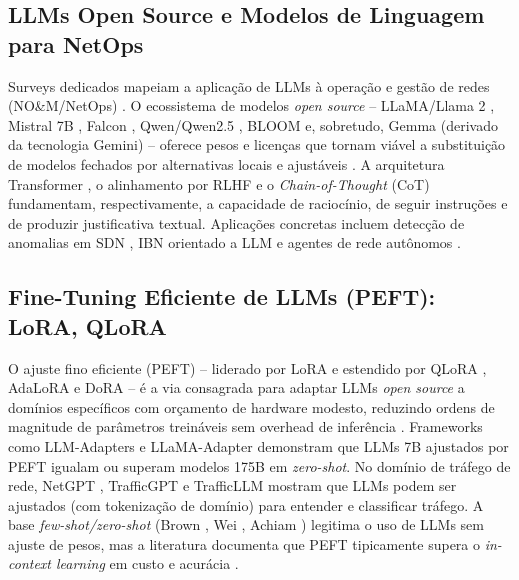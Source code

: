 \documentclass[12pt,a4paper]{article}
\begin{document}
\subsection{LLMs Open Source e Modelos de Linguagem para NetOps}
\label{sec:llm}

Surveys dedicados mapeiam a aplicação de LLMs à operação e gestão de redes
(NO\&M/NetOps) \cite{rA31}\cite{rA32}\cite{rA33}\cite{rA34}\cite{rA35}\cite{rA36}\cite{rA37}. O ecossistema de modelos
\textit{open source} -- LLaMA/Llama 2 \cite{rA310}\cite{rA311}, Mistral 7B \cite{rA312}, Falcon
\cite{rA313}, Qwen/Qwen2.5 \cite{rA314}\cite{rA315}, BLOOM \cite{rA316} e, sobretudo, Gemma
\cite{rA317} (derivado da tecnologia Gemini) -- oferece pesos e licenças que tornam
viável a substituição de modelos fechados por alternativas locais e ajustáveis
\cite{rA318}. A arquitetura Transformer \cite{rA319}, o alinhamento por RLHF \cite{rA320} e o
\textit{Chain-of-Thought} (CoT) \cite{rA321} fundamentam, respectivamente, a
capacidade de raciocínio, de seguir instruções e de produzir justificativa
textual. Aplicações concretas incluem detecção de anomalias em SDN
\cite{rA325}\cite{rA327}, IBN orientado a LLM \cite{rA324}\cite{rA332}\cite{rA333} e agentes de rede
autônomos \cite{rA338}\cite{rA334}\cite{rA335}\cite{rA336}\cite{rA337}.

\subsection{Fine-Tuning Eficiente de LLMs (PEFT): LoRA, QLoRA}
\label{sec:peft}

O ajuste fino eficiente (PEFT) -- liderado por LoRA \cite{rA41} e estendido por QLoRA
\cite{rA42}, AdaLoRA \cite{rA43} e DoRA \cite{rA44} -- é a via consagrada para adaptar LLMs
\textit{open source} a domínios específicos com orçamento de hardware modesto,
reduzindo ordens de magnitude de parâmetros treináveis sem overhead de
inferência \cite{rA45}\cite{rA49}\cite{rA415}. Frameworks como LLM-Adapters \cite{rA411} e
LLaMA-Adapter \cite{rA412} demonstram que LLMs 7B ajustados por PEFT igualam ou
superam modelos 175B em \textit{zero-shot}. No domínio de tráfego de rede,
NetGPT \cite{rA425}, TrafficGPT \cite{rA426} e TrafficLLM \cite{rA427} mostram que LLMs podem ser
ajustados (com tokenização de domínio) para entender e classificar tráfego. A
base \textit{few-shot/zero-shot} (Brown \cite{rA422}, Wei \cite{rA423}, Achiam \cite{rA424})
legitima o uso de LLMs sem ajuste de pesos, mas a literatura documenta que
PEFT tipicamente supera o \textit{in-context learning} em custo e acurácia
\cite{rA49}.
\end{document}
